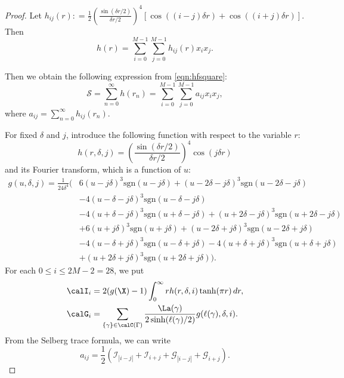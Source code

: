 \begin{proof}
Let $h_{ij}(r) : =\frac{1}{2} \left(\frac{\sin(\delta r / 2)}{\delta r / 2}\right)^{4}
     \left[ \cos((i-j) \delta r) + \cos((i+j) \delta r) \right]$.
Then 
\[
h(r) = \sum_{{i=0}}^{{M-1}} \sum_{{j=0}}^{{M-1}}h_{ij}(r)x_i x_j.
\]

Then we obtain the following expression from \eqref{eqn:hfsquare}:
\begin{equation}\label{eq:calS}
\mathcal{S} = \sum_{n=0}^{\infty} h(r_n) = \sum_{i=0}^{M-1} \sum_{j=0}^{M-1} a_{ij} x_{i} x_{j},
\end{equation}
where $a_{ij} =  \sum_{n=0}^{\infty} h_{ij}(r_n)$.

For fixed $\delta$ and $j$, introduce the following function with respect to the variable $r$:
\[
h(r, \delta, j) = \left(\frac{\sin(\delta r / 2)}{\delta r / 2}\right)^{4}\cos(j \delta r)
\]
and its Fourier transform, which is a function of $u$:
\begin{align*}
g(u, \delta, j) = \frac{1}{24 \delta^4} (&6 (u - j \delta)^3 \text{sgn}(u - j \delta) + (u - 2\delta - j \delta)^3 \text{sgn}(u - 2\delta - j \delta) \\
&- 4 (u - \delta - j \delta)^3 \text{sgn}(u - \delta - j \delta) \\
&- 4 (u + \delta - j \delta)^3 \text{sgn}(u + \delta - j \delta) + (u + 2\delta - j \delta)^3 \text{sgn}(u + 2\delta - j \delta) \\
&+ 6 (u + j \delta)^3 \text{sgn}(u + j \delta) + (u - 2\delta + j \delta)^3 \text{sgn}(u - 2\delta + j \delta) \\
&- 4 (u - \delta + j \delta)^3 \text{sgn}(u - \delta + j \delta) - 4 (u + \delta + j \delta)^3 \text{sgn}(u + \delta + j \delta) \\
&+ (u + 2\delta + j \delta)^3 \text{sgn}(u + 2\delta + j \delta)).
\end{align*}
For each $0\leq i\leq 2M-2 = 28$, we put
\begin{align*}
\calI_i & = 2(g(\X)-1)\int_0^\infty r h(r , \delta, i) \tanh(\pi r) \,dr,\\
\calG_i & = \sum_{\{\gamma\} \in \calC(\Gamma)} \frac{\La(\gamma)}{2 \sinh(\ell(\gamma)/2)}g(\ell(\gamma), \delta, i).
\end{align*}
From the Selberg trace formula, we can write
\begin{equation}\label{eq:a_ij}
a_{ij} = \frac{1}{2}(\mathcal{I}_{|i-j|} + \mathcal{I}_{i+j} + \mathcal{G}_{|i-j|} + \mathcal{G}_{i+j}).
\end{equation}


\end{proof}
